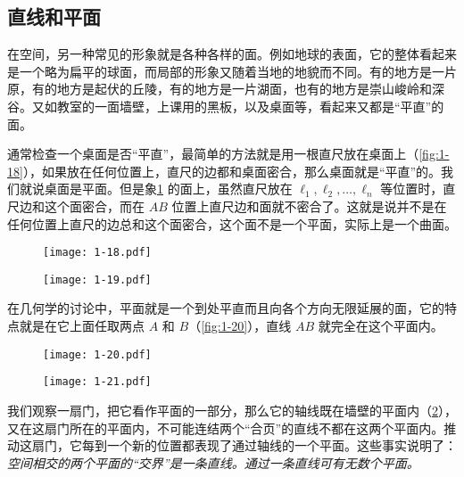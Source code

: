 \subsection{直线和平面}
在空间，另一种常见的形象就是各种各样的面。例如地球的表面，它的整体看起来是一个略为扁平的球面，而局部的形象又随着当地的地貌而不同。有的地方是一片原，有的地方是起伏的丘陵，有的地方是一片湖面，也有的地方是崇山峻岭和深谷。又如教室的一面墙壁，上课用的黑板，以及桌面等，看起来又都是“平直”的面。

通常检查一个桌面是否“平直”，最简单的方法就是用一根直尺放在桌面上（\cref{fig:1-18}），如果放在任何位置上，直尺的边都和桌面密合，那么桌面就是“平直”的。我们就说桌面是平面。但是象\cref{fig:1-19} 的面上，虽然直尺放在  $\ell_1,\ell_2,\ldots,\ell_n$ 等位置时，直尺边和这个面密合，而在 $AB$ 位置上直尺边和面就不密合了。这就是说并不是在任何位置上直尺的边总和这个面密合，这个面不是一个平面，实际上是一个曲面。
\begin{figure}
  \begin{minipage}[b]{0.48\linewidth}
    \centering
		\texttt{[image: 1-18.pdf]}
    \caption{}\label{fig:1-18}
  \end{minipage}
  \begin{minipage}[b]{0.48\linewidth}
    \centering
		\texttt{[image: 1-19.pdf]}
    \caption{}\label{fig:1-19}
  \end{minipage}
\end{figure}

在几何学的讨论中，平面就是一个到处平直而且向各个方向无限延展的面，它的特点就是在它上面任取两点 $A$ 和 $B$（\cref{fig:1-20}），直线 $AB$ 就完全在这个平面内。

\begin{figure}
  \begin{minipage}[b]{0.48\linewidth}
    \centering
		\texttt{[image: 1-20.pdf]}
    \caption{}\label{fig:1-20}
  \end{minipage}
  \begin{minipage}[b]{0.48\linewidth}
    \centering
    \texttt{[image: 1-21.pdf]}
    \caption{}\label{fig:1-21}
  \end{minipage}
\end{figure}

我们观察一扇门，把它看作平面的一部分，那么它的轴线既在墙壁的平面内（\cref{fig:1-21}），又在这扇门所在的平面内，不可能连结两个“合页”的直线不都在这两个平面内。推动这扇门，它每到一个新的位置都表现了通过轴线的一个平面。这些事实说明了：\emph{空间相交的两个平面的“交界”是一条直线。通过一条直线可有无数个平面。}

